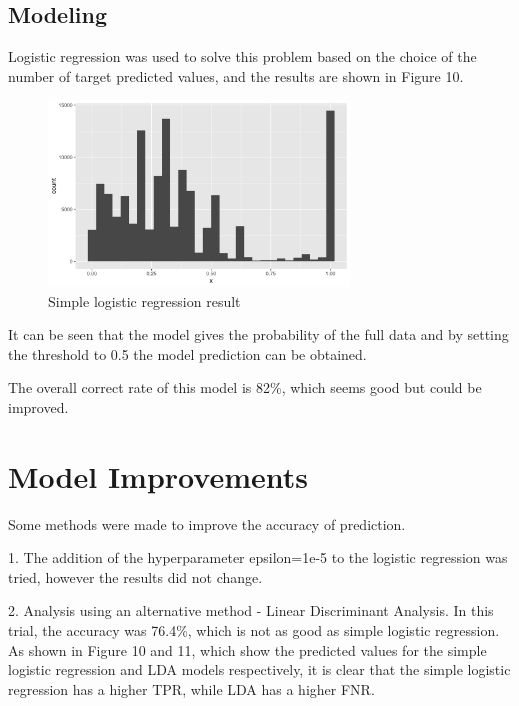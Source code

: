 \documentclass{article}
\begin{document}
\subsection{Modeling}

Logistic regression was used to solve this problem based on the choice of the number of target predicted values, and the results are shown in Figure 10.

\begin{figure}[h]
\centering
\includegraphics[width=8cm]{lrresult.png} %
\caption{Simple logistic regression result} %
\end{figure}

It can be seen that the model gives the probability of the full data and by setting the threshold to 0.5 the model prediction can be obtained.

The overall correct rate of this model is 82\%, which seems good but could be improved.

\section{Model Improvements}

Some methods were made to improve the accuracy of prediction.

1. The addition of the hyperparameter epsilon=1e-5 to the logistic regression was tried, however the results did not change. 

2. Analysis using an alternative method - Linear Discriminant Analysis. In this trial, the accuracy was 76.4\%, which is not as good as simple logistic regression. As shown in Figure 10 and 11, which show the predicted values for the simple logistic regression and LDA models respectively, it is clear that the simple logistic regression has a higher TPR, while LDA has a higher FNR.
\end{document}
